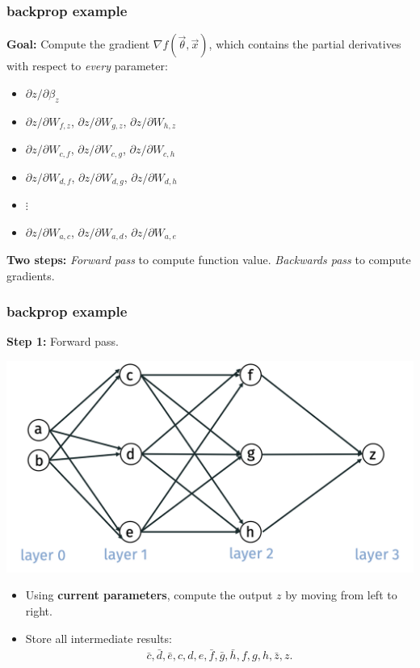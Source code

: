 \documentclass[handout,compress]{beamer}
\begin{document}
	\begin{frame}
		\frametitle{backprop example}
		\textbf{Goal:} Compute the gradient $\nabla f(\vec{\theta},\vec{x})$, which contains the partial derivatives with respect to \emph{every} parameter:
		\begin{itemize}
			\item $\partial z / \partial \beta_z$
			\item $\partial z / \partial W_{f,z}$, $\partial z / \partial W_{g,z}$, $\partial z / \partial W_{h,z}$
			\item $\partial z / \partial W_{c,f}$, $\partial z / \partial W_{c,g}$, $\partial z / \partial W_{c,h}$
			\item $\partial z / \partial W_{d,f}$, $\partial z / \partial W_{d,g}$, $\partial z / \partial W_{d,h}$
			\item $\vdots$
			\item $\partial z / \partial W_{a,c}$, $\partial z / \partial W_{a,d}$, $\partial z / \partial W_{a,e}$
		\end{itemize}
		\textbf{Two steps:} \emph{Forward pass} to compute function value. \emph{Backwards pass} to compute gradients. 
	\end{frame}
	
	\begin{frame}
		\frametitle{backprop example}
		\textbf{Step 1:} Forward pass. 
		\begin{center}
			\vspace{-.5em}
			\includegraphics[width=.6\textwidth]{no_select.png}
			\vspace{-1em}
		\end{center}
		\begin{itemize}
			\item Using \textbf{current parameters}, compute the output $z$ by moving from left to right.
			\item Store all intermediate results: \begin{align*}\bar{c}, \bar{d}, \bar{e}, c,d,e, \bar{f}, \bar{g}, \bar{h}, f,g,h, \bar{z}, z. \end{align*}
		\end{itemize}	
	\end{frame}
	
\end{document}
